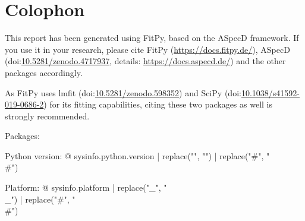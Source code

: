 \section*{Colophon}

This report has been generated using FitPy, based on the ASpecD framework. If you use it in your research, please cite FitPy (\url{https://docs.fitpy.de/}), ASpecD (doi:\href{https://doi.org/10.5281/zenodo.4717937}{10.5281/zenodo.4717937}, details: \url{https://docs.aspecd.de/}) and the other packages accordingly.

As FitPy uses lmfit (doi:\href{https://doi.org/10.5281/zenodo.598352}{10.5281/zenodo.598352}) and SciPy (doi:\href{https://doi.org/10.1038/s41592-019-0686-2}{10.1038/s41592-019-0686-2}) for its fitting capabilities, citing these two packages as well is strongly recommended.

Packages: %


Python version: {@ sysinfo.python.version | replace("\n", "") | replace("#", "\\#") }

Platform: {@ sysinfo.platform | replace("_", "\\_") | replace("#", "\\#") }
